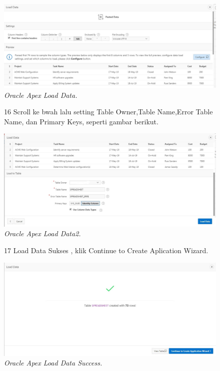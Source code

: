 \begin{enumerate}
\begin{figure}
    \begin{center}
\includegraphics[scale=0.4]{figures/login4.jpg}
    \caption{\textit{Oracle Apex Load Data.}}
        \end{center}
\label{gambar}
\end{figure}

\begin{figure}
\item[16] Scroll ke bwah lalu setting Table Owner,Table Name,Error Table Name, dan Primary Keys, seperti gambar berikut.

    \begin{center}
\includegraphics[scale=0.4]{figures/login5.jpg}
    \caption{\textit{Oracle Apex Load Data2.}}
        \end{center}
\label{gambar}
\end{figure}

\begin{figure}
\item[17] Load Data Sukses , klik Continue to Create Aplication Wizard.

    \begin{center}
\includegraphics[scale=0.4]{figures/login6.jpg}
    \caption{\textit{Oracle Apex Load Data Success.}}
        \end{center}
\label{gambar}
\end{figure}


\end{enumerate}
